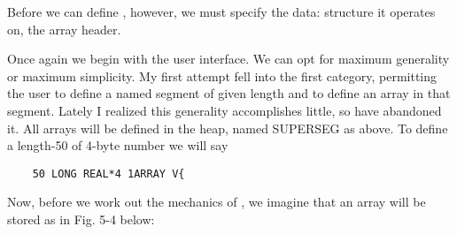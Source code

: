 Before we can define \bc{\}}, however, we must specify the data: structure it operates on, \ie the array header.

Once again we begin with the user interface. We can opt for maximum generality or maximum simplicity. My first attempt fell into the first category, permitting the user to define a named segment of given length and to define an array in that segment. Lately I realized this generality accomplishes little, so have abandoned it. All arrays will be defined in the heap, named SUPERSEG as above. To define a length-50  of 4-byte number we will say

\begin{lstlisting}
    50 LONG REAL*4 1ARRAY V{
\end{lstlisting}

Now, before we work out the mechanics of , we imagine that an array will be stored as in Fig. 5-4 below:

